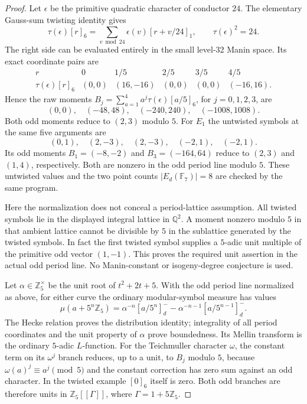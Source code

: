 \begin{proof}
Let $\epsilon$ be the primitive quadratic character of conductor
$24$. The elementary Gauss-sum twisting identity gives
\[
 \tau(\epsilon)[r]_6
   =\sum_{v\bmod24}\epsilon(v)[r+v/24]_1,
 \qquad \tau(\epsilon)^2=24.
\]
The right side can be evaluated entirely in the small level-$32$
Manin space. Its exact coordinate pairs are
\[
 \begin{array}{c|rrrrr}
 r&0&1/5&2/5&3/5&4/5\\\hline
 \tau(\epsilon)[r]_6
 &(0,0)&(16,-16)&(0,0)&(0,0)&(-16,16).
 \end{array}
\]
Hence the raw moments $B_j=\sum_{a=1}^4a^j
\tau(\epsilon)[a/5]_6$, for $j=0,1,2,3$, are
\[
 (0,0),\quad(-48,48),\quad(-240,240),\quad(-1008,1008).
\]
Both odd moments reduce to $(2,3)$ modulo $5$.
For $E_1$ the untwisted symbols at the same five arguments are
\[
 (0,1),\quad(2,-3),\quad(2,-3),\quad(-2,1),\quad(-2,1).
\]
Its odd moments $B_1=(-8,-2)$ and $B_3=(-164,64)$ reduce to
$(2,3)$ and $(1,4)$, respectively. Both are nonzero in the odd
period line modulo $5$. These untwisted values and the two
point counts $|E_d(\mathbb F_7)|=8$ are checked by the same program.

Here the normalization does not conceal a period-lattice assumption.
All twisted symbols lie in the displayed integral lattice in
$\mathbb Q^2$. A moment nonzero modulo $5$ in that ambient lattice
cannot be divisible by $5$ in the sublattice generated by the
twisted symbols. In fact the first twisted symbol supplies a
$5$-adic unit multiple of the primitive odd vector $(1,-1)$.
This proves the required unit assertion in the actual odd period
line. No Manin-constant or isogeny-degree conjecture is used.

Let $\alpha\in\mathbb Z_5^\times$ be the unit root of
$t^2+2t+5$. With the odd period line normalized as above, for either
curve the
ordinary modular-symbol measure has values
\[
 \mu(a+5^n\mathbb Z_5)
 =\alpha^{-n}[a/5^n]_d^-
    -\alpha^{-n-1}[a/5^{n-1}]_d^-.
\]
The Hecke relation proves the distribution identity; integrality
of all period coordinates and the unit property of $\alpha$ prove
boundedness. Its Mellin transform is the ordinary $5$-adic
$L$-function. For the Teichmuller character $\omega$, the constant
term on its $\omega^j$ branch reduces, up to a unit, to $B_j$
modulo $5$, because $\omega(a)^j\equiv a^j\pmod5$ and the
constant correction has zero sum against an odd character. In
the twisted example $[0]_6$ itself is zero.
Both odd branches are therefore units in $\mathbb Z_5[[\Gamma]]$,
where $\Gamma=1+5\mathbb Z_5$.


\end{proof}
